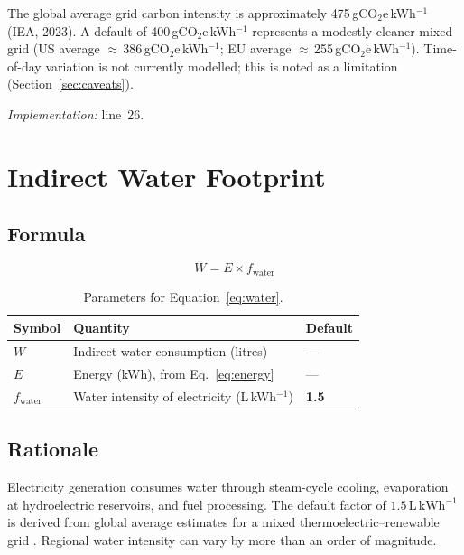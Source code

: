 \documentclass[12pt]{article}
\begin{document}
The global average grid carbon intensity is approximately
475\,gCO$_2$e\,kWh$^{-1}$ (IEA, 2023). A default of 400\,gCO$_2$e\,kWh$^{-1}$
represents a modestly cleaner mixed grid (US average
$\approx$\,386\,gCO$_2$e\,kWh$^{-1}$; EU average
$\approx$\,255\,gCO$_2$e\,kWh$^{-1}$). Time-of-day variation is not currently
modelled; this is noted as a limitation (Section~\ref{sec:caveats}).

\textit{Implementation:} line~26.

\section{Indirect Water Footprint}

\subsection*{Formula}

\begin{equation}
  W = E \times f_{\text{water}}
  \label{eq:water}
\end{equation}

\begin{table}[h!]
\centering
\begin{tabular}{@{}lll@{}}
\toprule
Symbol & Quantity & Default \\
\midrule
$W$                 & Indirect water consumption (litres)       & --- \\
$E$                 & Energy (kWh), from Eq.~\ref{eq:energy}    & --- \\
$f_{\text{water}}$  & Water intensity of electricity (L\,kWh$^{-1}$) & \textbf{1.5} \\
\bottomrule
\end{tabular}
\caption{Parameters for Equation~\ref{eq:water}.}
\end{table}

\subsection*{Rationale}

Electricity generation consumes water through steam-cycle cooling, evaporation
at hydroelectric reservoirs, and fuel processing. The default factor of
$1.5\,\text{L}\,\text{kWh}^{-1}$ is derived from global average estimates for
a mixed thermoelectric--renewable grid \citep{meldrum2013, grubert2018}.
Regional water intensity can vary by more than an order of magnitude.
\end{document}

